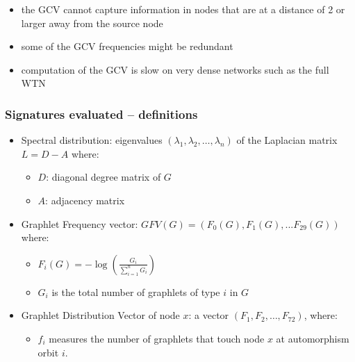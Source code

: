 \documentclass[11pt,xcolor=table]{beamer}
\begin{document}
\begin{frame}
  \begin{itemize}
   \item the GCV cannot capture information in nodes that are at a distance of 2 or larger away from the source node
   \item some of the GCV frequencies might be redundant
   \item computation of the GCV is slow on very dense networks such as the full WTN
  \end{itemize}

\end{frame}

\begin{frame}
 \frametitle{Signatures evaluated -- definitions}
 
 \begin{itemize}
  \item Spectral distribution: eigenvalues $(\lambda_1, \lambda_2, \dots, \lambda_n)$ of the Laplacian matrix $L = D - A$ where:
  \begin{itemize}
   \item $D$: diagonal degree matrix of $G$ 
   \item $A$: adjacency matrix
  \end{itemize}
  \item Graphlet Frequency vector: $GFV(G) = \left(F_0(G), F_1(G), ... F_{29}(G)\right) $ where:
  \begin{itemize}
    \item $ F_i(G) = -\log\left(\frac{G_i}{\sum_{i=1}^{n}G_i}\right) $
    \item $G_i$ is the total number of graphlets of type $i$ in $G$
  \end{itemize}
  \item Graphlet Distribution Vector of node $x$: a vector $ (F_1, F_2, \dots, F_{72}) $, where:
  \begin{itemize}
    \item $f_i$ measures the number of graphlets that touch node $x$ at automorphism orbit $i$.
  \end{itemize}
 \end{itemize}

\end{frame}
\end{document}
